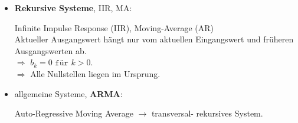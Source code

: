 \begin{itemize}[leftmargin=*]
	\item \textbf{Rekursive Systeme}, IIR, MA:
	
	{\small Infinite Impulse Response (IIR), Moving-Average (AR)\\
		Aktueller Ausgangswert hängt nur vom aktuellen Eingangswert
		und früheren Ausgangswerten ab.}\\
	$\Rightarrow$ $b_k=0 \texttt{ für } k>0$.\\
	$\Rightarrow$ Alle Nullstellen liegen im Ursprung.
	
	\item allgemeine Systeme, \textbf{ARMA}: 
	
	Auto-Regressive Moving Average $\rightarrow$ transversal-	rekursives System.
\end{itemize}
